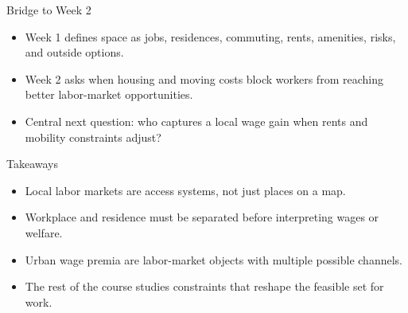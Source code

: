 \documentclass[aspectratio=169,11pt]{beamer}
\begin{document}
\begin{frame}{Bridge to Week 2}
\begin{itemize}
    \item Week 1 defines space as jobs, residences, commuting, rents, amenities, risks, and outside options.
    \item Week 2 asks when housing and moving costs block workers from reaching better labor-market opportunities.
    \item Central next question: who captures a local wage gain when rents and mobility constraints adjust?
\end{itemize}
\end{frame}

\begin{frame}{Takeaways}
\begin{itemize}
    \item Local labor markets are access systems, not just places on a map.
    \item Workplace and residence must be separated before interpreting wages or welfare.
    \item Urban wage premia are labor-market objects with multiple possible channels.
    \item The rest of the course studies constraints that reshape the feasible set for work.
\end{itemize}
\end{frame}
\end{document}
